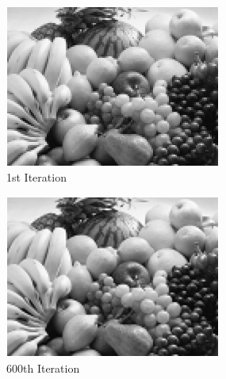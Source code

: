 \documentclass{paper}
\begin{document}
\begin{enumerate}
\begin{figure}[h]
\begin{center}
	\begin{subfigure}[b]{0.49\textwidth}
                \includegraphics[width=\textwidth]{it0}
                \caption{1st Iteration}
        \end{subfigure}
        	\begin{subfigure}[b]{0.49\textwidth}
                \includegraphics[width=\textwidth]{it600}
                \caption{600th Iteration}
        \end{subfigure}
        \begin{subfigure}[b]{0.49\textwidth}

\end{subfigure}
\end{center}
\end{figure}
\end{enumerate}
\end{document}
